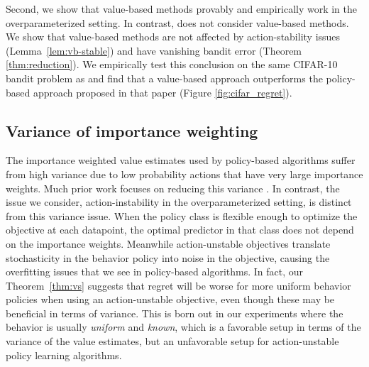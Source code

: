 Second, we show that value-based methods provably and empirically work in the overparameterized setting. In contrast, \citet{joachims2018deep} does not consider value-based methods. We show that value-based methods are not affected by action-stability issues (Lemma~\ref{lem:vb-stable}) and have vanishing bandit error (Theorem \ref{thm:reduction}). We empirically test this conclusion on the same CIFAR-10 bandit problem as \citet{joachims2018deep} and find that a value-based approach outperforms the policy-based approach proposed in that paper (Figure \ref{fig:cifar_regret}).

\subsection{Variance of importance weighting}

The importance weighted value estimates used by policy-based algorithms suffer from high variance due to low probability actions that have very large importance weights.
Much prior work focuses on reducing this variance \cite{strehl2010learning, bottou2013counterfactual, swaminathan2015counterfactual}.
In contrast, the issue we consider, action-instability in the overparameterized setting, is distinct from this variance issue.
When the policy class is flexible enough to optimize the objective at each datapoint, the optimal predictor in that class does not depend on the importance weights.
Meanwhile action-unstable objectives translate stochasticity in the behavior policy into noise in the objective, causing the overfitting issues that we see in policy-based algorithms.
In fact, our Theorem~\ref{thm:vs} suggests that regret will be worse for more uniform behavior policies when using an action-unstable objective, even though these may be beneficial in terms of variance.
This is born out in our experiments where the behavior is usually \emph{uniform} and \emph{known}, which is a favorable setup in terms of the variance of the value estimates, but an unfavorable setup for action-unstable policy learning algorithms.



